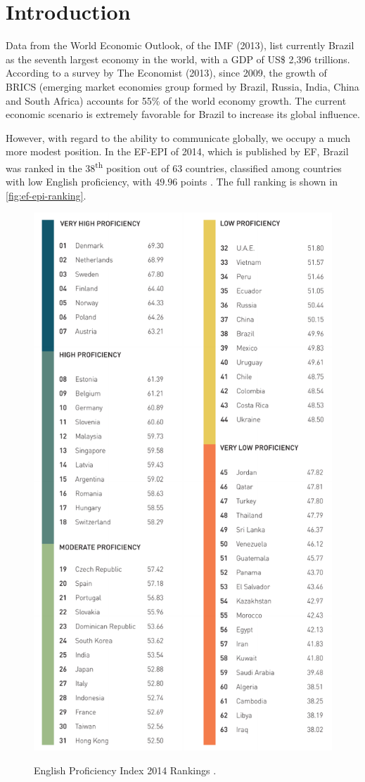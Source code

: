 \chapter{Introduction}\label{ch:introduction}
Data from the World Economic Outlook, of the IMF (2013), list currently Brazil as the seventh largest economy in the world, with a GDP of US\$ 2,396 trillions. According to a survey by The Economist (2013), since 2009, the growth of BRICS (emerging market economies group formed by Brazil, Russia, India, China and South Africa) accounts for 55\% of the world economy growth. The current economic scenario is extremely favorable for Brazil to increase its global influence.

However, with regard to the ability to communicate globally, we occupy a much more modest position. In the \ac{EF-EPI} of 2014, which is published by \ac{EF}, Brazil was ranked in the 38\textsuperscript{th} position out of 63 countries, classified among countries with low English proficiency, with $49.96$ points \cite{EF2014}. The full ranking is shown in \autoref{fig:ef-epi-ranking}.

\begin{figure}[!htpb]
  \centering
  {\includegraphics[width=0.7\linewidth]{gfx/ef-epi-ranking-2014.pdf}}
  \caption{English Proficiency Index 2014 Rankings \cite{EF2014}.}
  \label{fig:ef-epi-ranking}
\end{figure}

